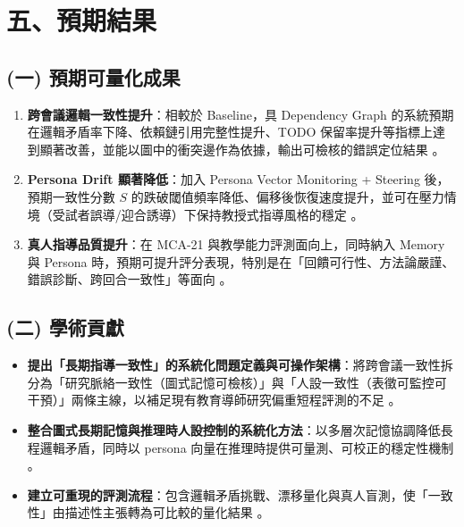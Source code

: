 \section*{五、預期結果}

\subsection*{(一) 預期可量化成果}
\begin{enumerate}
  \item \textbf{跨會議邏輯一致性提升}：相較於 Baseline，具 Dependency Graph 的系統預期在邏輯矛盾率下降、依賴鏈引用完整性提升、TODO 保留率提升等指標上達到顯著改善，並能以圖中的衝突邊作為依據，輸出可檢核的錯誤定位結果 \citep{a2602_05665v1_graphagentmemory,a2505_16067v2_memorymanagementimpacts}。
  \item \textbf{Persona Drift 顯著降低}：加入 Persona Vector Monitoring + Steering 後，預期一致性分數 $S$ 的跌破閾值頻率降低、偏移後恢復速度提升，並可在壓力情境（受試者誤導/迎合誘導）下保持教授式指導風格的穩定 \citep{a2507_21509v3_personavectors,turner-etal-2023-activation-addition}。
  \item \textbf{真人指導品質提升}：在 MCA-21 與教學能力評測面向上，同時納入 Memory 與 Persona 時，預期可提升評分表現，特別是在「回饋可行性、方法論嚴謹、錯誤診斷、跨回合一致性」等面向 \citep{hyun2022mca21,maurya-etal-2025-unifying}。
\end{enumerate}

\subsection*{(二) 學術貢獻}
\begin{itemize}
  \item \textbf{提出「長期指導一致性」的系統化問題定義與可操作架構}：將跨會議一致性拆分為「研究脈絡一致性（圖式記憶可檢核）」與「人設一致性（表徵可監控可干預）」兩條主線，以補足現有教育導師研究偏重短程評測的不足 \citep{tack-etal-2023-bea,maurya-etal-2025-unifying}。
  \item \textbf{整合圖式長期記憶與推理時人設控制的系統化方法}：以多層次記憶協調降低長程邏輯矛盾，同時以 persona 向量在推理時提供可量測、可校正的穩定性機制 \citep{a2310_08560v2_memgpt,a2602_05665v1_graphagentmemory,a2507_21509v3_personavectors}。
  \item \textbf{建立可重現的評測流程}：包含邏輯矛盾挑戰、漂移量化與真人盲測，使「一致性」由描述性主張轉為可比較的量化結果 \citep{a2402_17753v1_locomomemoryeval,hyun2022mca21}。
\end{itemize}

